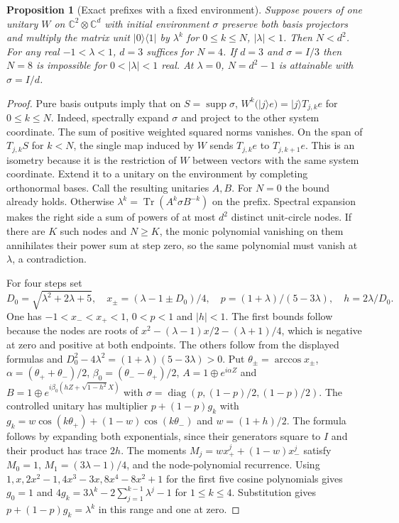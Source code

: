 \documentclass[aps,pra,onecolumn,superscriptaddress,nofootinbib,10pt]{revtex4-2}
\newtheorem{proposition}[theorem]{Proposition}
\theoremstyle{definition}
\theoremstyle{remark}
\newcommand{\C}{\mathbb{C}}
\newcommand{\tr}{\operatorname{Tr}}
\begin{document}
\begin{proposition}[Exact prefixes with a fixed environment]\label{ob:prefix}
Suppose powers of one unitary $W$ on $\C^2\otimes\C^d$ with initial
environment $\sigma$ preserve both basis projectors and multiply
the matrix unit $|0\rangle\langle1|$ by $\lambda^k$
for $0\le k\le N$, $|\lambda|<1$. Then $N<d^2$.
For any real $-1<\lambda<1$, $d=3$ suffices for $N=4$.
If $d=3$ and $\sigma=I/3$ then $N=8$ is impossible for
$0<|\lambda|<1$ real. At $\lambda=0$, $N=d^2-1$ is attainable
with $\sigma=I/d$.
\end{proposition}
\begin{proof}
Pure basis outputs imply that on $S=\operatorname{supp}\sigma$,
$W^k(|j\rangle e)=|j\rangle T_{j,k}e$ for $0\le k\le N$.
Indeed, spectrally expand $\sigma$ and project to the other system
coordinate. The sum of positive weighted squared norms vanishes.
On the span of $T_{j,k}S$ for $k<N$, the single map induced by
$W$ sends $T_{j,k}e$ to $T_{j,k+1}e$. This is an isometry because
it is the restriction of $W$ between vectors with the same system
coordinate. Extend it to a unitary on the environment by completing
orthonormal bases. Call the resulting unitaries $A,B$. For $N=0$
the bound already holds. Otherwise $\lambda^k=\tr(A^k\sigma B^{-k})$
on the prefix. Spectral expansion makes the right side a sum of
powers of at most $d^2$ distinct unit-circle nodes.
If there are $K$ such nodes and $N\ge K$, the monic polynomial
vanishing on them annihilates their power sum at step zero,
so the same polynomial must vanish at $\lambda$, a contradiction.

For four steps set
\[
 D_0=\sqrt{\lambda^2+2\lambda+5},\quad
 x_\pm=(\lambda-1\pm D_0)/4,\quad
 p=(1+\lambda)/(5-3\lambda),\quad h=2\lambda/D_0 .
\]
One has $-1<x_-<x_+<1$, $0<p<1$ and $|h|<1$.
The first bounds follow because the nodes are roots of
$x^2-(\lambda-1)x/2-(\lambda+1)/4$,
which is negative at zero and positive at both endpoints.
The others follow from the displayed formulas and
$D_0^2-4\lambda^2=(1+\lambda)(5-3\lambda)>0$.
Put $\theta_\pm=\arccos x_\pm$, $\alpha=(\theta_++\theta_-)/2$,
$\beta_0=(\theta_--\theta_+)/2$,
$A=1\oplus e^{i\alpha Z}$ and
$B=1\oplus e^{i\beta_0(hZ+\sqrt{1-h^2}X)}$ with
$\sigma=\operatorname{diag}(p,(1-p)/2,(1-p)/2)$.
The controlled unitary has multiplier $p+(1-p)g_k$ with
$g_k=w\cos(k\theta_+)+(1-w)\cos(k\theta_-)$ and $w=(1+h)/2$.
The formula follows by expanding both exponentials, since their
generators square to $I$ and their product has trace $2h$.
The moments $M_j=wx_+^j+(1-w)x_-^j$ satisfy $M_0=1$,
$M_1=(3\lambda-1)/4$, and the node-polynomial recurrence.
Using $1,x,2x^2-1,4x^3-3x,8x^4-8x^2+1$ for the first five cosine
polynomials gives $g_0=1$ and
$4g_k=3\lambda^k-2\sum_{j=1}^{k-1}\lambda^j-1$ for $1\le k\le4$.
Substitution gives $p+(1-p)g_k=\lambda^k$ in this range and one at zero.


\end{proof}
\end{document}
